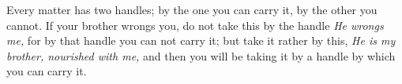 Every matter  has two handles; by  the one you can  carry it, by the  other you
cannot. If  your brother wrongs  you, do not take  this by the  handle \emph{He
wrongs me,}  for by that  handle you can  not carry it;  but take it  rather by
this, \emph{He is my  brother, nourished with me,} and then  you will be taking
it by a handle by which you can carry it.
